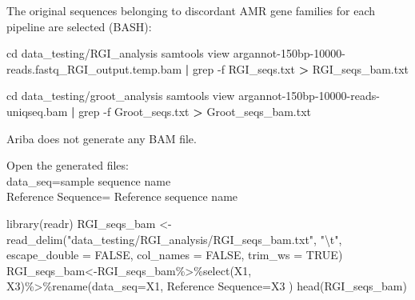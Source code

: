 \documentclass[
]{article}
\newenvironment{Shaded}{\begin{snugshade}}{\end{snugshade}}
\newcommand{\AttributeTok}[1]{\textcolor[rgb]{0.77,0.63,0.00}{#1}}
\newcommand{\BuiltInTok}[1]{#1}
\newcommand{\ConstantTok}[1]{\textcolor[rgb]{0.00,0.00,0.00}{#1}}
\newcommand{\ExtensionTok}[1]{#1}
\newcommand{\FunctionTok}[1]{\textcolor[rgb]{0.00,0.00,0.00}{#1}}
\newcommand{\KeywordTok}[1]{\textcolor[rgb]{0.13,0.29,0.53}{\textbf{#1}}}
\newcommand{\NormalTok}[1]{#1}
\newcommand{\OperatorTok}[1]{\textcolor[rgb]{0.81,0.36,0.00}{\textbf{#1}}}
\newcommand{\OtherTok}[1]{\textcolor[rgb]{0.56,0.35,0.01}{#1}}
\newcommand{\SpecialCharTok}[1]{\textcolor[rgb]{0.00,0.00,0.00}{#1}}
\newcommand{\StringTok}[1]{\textcolor[rgb]{0.31,0.60,0.02}{#1}}
\begin{document}
The original sequences belonging to discordant AMR gene families for
each pipeline are selected (BASH):

\begin{Shaded}
\begin{Highlighting}[]
\BuiltInTok{cd}\NormalTok{ data\_testing/RGI\_analysis}
\ExtensionTok{samtools}\NormalTok{ view argannot{-}150bp{-}10000{-}reads.fastq\_RGI\_output.temp.bam }\KeywordTok{|} \FunctionTok{grep} \AttributeTok{{-}f}\NormalTok{ RGI\_seqs.txt }\OperatorTok{\textgreater{}}\NormalTok{ RGI\_seqs\_bam.txt}
\end{Highlighting}
\end{Shaded}

\begin{Shaded}
\begin{Highlighting}[]
\BuiltInTok{cd}\NormalTok{ data\_testing/groot\_analysis}
\ExtensionTok{samtools}\NormalTok{ view argannot{-}150bp{-}10000{-}reads{-}uniqseq.bam }\KeywordTok{|} \FunctionTok{grep} \AttributeTok{{-}f}\NormalTok{ Groot\_seqs.txt }\OperatorTok{\textgreater{}}\NormalTok{ Groot\_seqs\_bam.txt}
\end{Highlighting}
\end{Shaded}

Ariba does not generate any BAM file.

Open the generated files:\\
data\_seq=sample sequence name\\
Reference Sequence= Reference sequence name

\begin{Shaded}
\begin{Highlighting}[]
\FunctionTok{library}\NormalTok{(readr)}
\NormalTok{RGI\_seqs\_bam }\OtherTok{\textless{}{-}} \FunctionTok{read\_delim}\NormalTok{(}\StringTok{"data\_testing/RGI\_analysis/RGI\_seqs\_bam.txt"}\NormalTok{, }
    \StringTok{"}\SpecialCharTok{\textbackslash{}t}\StringTok{"}\NormalTok{, }\AttributeTok{escape\_double =} \ConstantTok{FALSE}\NormalTok{, }\AttributeTok{col\_names =} \ConstantTok{FALSE}\NormalTok{, }
    \AttributeTok{trim\_ws =} \ConstantTok{TRUE}\NormalTok{)}
\NormalTok{RGI\_seqs\_bam}\OtherTok{\textless{}{-}}\NormalTok{RGI\_seqs\_bam}\SpecialCharTok{\%\textgreater{}\%}\FunctionTok{select}\NormalTok{(X1, X3)}\SpecialCharTok{\%\textgreater{}\%}\FunctionTok{rename}\NormalTok{(}\AttributeTok{data\_seq=}\NormalTok{X1, }\StringTok{\textasciigrave{}}\AttributeTok{Reference Sequence}\StringTok{\textasciigrave{}}\OtherTok{=}\NormalTok{X3 )}
\FunctionTok{head}\NormalTok{(RGI\_seqs\_bam)}
\end{Highlighting}
\end{Shaded}
\end{document}
